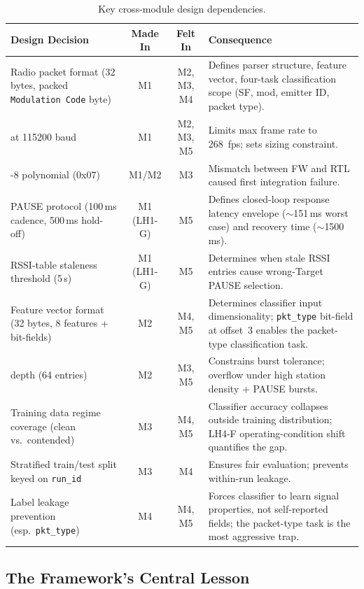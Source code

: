 \documentclass[11pt,letterpaper]{article}
\begin{document}
	\begin{table}[ht!]
		\centering
		\caption{Key cross-module design dependencies.}
		\label{tab:dependencies}
		\renewcommand{\arraystretch}{1.3}
		\begin{tabularx}{\textwidth}{X c c X}
			\toprule
			\textbf{Design Decision} & \textbf{Made In} & \textbf{Felt In} & \textbf{Consequence} \\
			\midrule
			Radio packet format (32 bytes, packed \texttt{Modulation Code} byte) & M1 & M2, M3, M4 & Defines parser structure, feature vector, four-task classification scope (SF, mod, emitter ID, packet type). \\
			\UART{} at 115200 baud & M1 & M2, M3, M5 & Limits max frame rate to 268~fps; sets \FIFO{} sizing constraint. \\
			\CRC{}-8 polynomial (0x07) & M1/M2 & M3 & Mismatch between FW and RTL caused first integration failure. \\
			PAUSE protocol (100\,ms cadence, 500\,ms hold-off) & M1 (LH1-G) & M5 & Defines closed-loop response latency envelope ($\sim$151\,ms worst case) and recovery time ($\sim$1500\,ms). \\
			RSSI-table staleness threshold (5\,s) & M1 (LH1-G) & M5 & Determines when stale RSSI entries cause wrong-Target PAUSE selection. \\
			Feature vector format (32 bytes, 8 features + bit-fields) & M2 & M4, M5 & Determines classifier input dimensionality; \texttt{pkt\_type} bit-field at offset~3 enables the packet-type classification task. \\
			\FIFO{} depth (64 entries) & M2 & M3, M5 & Constrains burst tolerance; overflow under high station density + PAUSE bursts. \\
			Training data regime coverage (clean vs.\ contended) & M3 & M4, M5 & Classifier accuracy collapses outside training distribution; LH4-F operating-condition shift quantifies the gap. \\
			Stratified train/test split keyed on \texttt{run\_id} & M3 & M4 & Ensures fair evaluation; prevents within-run leakage. \\
			Label leakage prevention (esp.\ \texttt{pkt\_type}) & M4 & M4, M5 & Forces classifier to learn signal properties, not self-reported fields; the packet-type task is the most aggressive trap. \\
			\bottomrule
		\end{tabularx}
	\end{table}

	\subsection{The Framework's Central Lesson}
\end{document}
